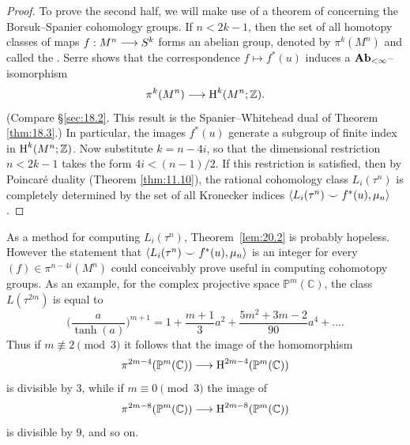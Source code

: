 \documentclass[../main]{subfiles}
\begin{document}
\begin{proof}
To prove the second half, we will make use of a theorem of \cite[p. 289]{serre} concerning the Borsuk--Spanier cohomology groups. If $n < 2 k - 1$, then the set of all homotopy classes of maps $f : M^n \longrightarrow S^k$ forms an abelian group, denoted by $\pi^k(M^n)$ and called the . Serre shows that the correspondence $f \mapsto f^\ast(u)$ induces a $\mathbf{Ab}_{<\infty}$--isomorphism \[\pi^k(M^n) \longrightarrow \operatorname{H}^k(M^n; \mathbb Z).\] (Compare \S\ref{sec:18.2}. This result is the Spanier--Whitehead dual of Theorem \ref{thm:18.3}.) In particular, the images $f^\ast(u)$ generate a subgroup of finite index in $\operatorname{H}^k(M^n; \mathbb Z)$. Now substitute $k = n - 4i$, so that the dimensional restriction $n < 2 k - 1$ takes the form $4 i < (n - 1)/2$. If this restriction is satisfied, then by Poincar\'e duality (Theorem \ref{thm:11.10}), the rational cohomology class $L_i(\tau^n)$ is completely determined by the set of all Kronecker indices $\langle L_i(\tau^n) \smile f^\ast(u),\mu_n\rangle$.
\end{proof}

\begin{remark*}
As a method for computing $L_i(\tau^n)$, Theorem~\ref{lem:20.2} is probably hopeless. However the statement that $\langle L_i(\tau^n) \smile f^\ast(u),\mu_n\rangle$ is an integer for every\newline $(f) \in \pi^{n - 4i}(M^n)$ could conceivably prove useful in computing cohomotopy groups. As an example, for the complex projective space ${\mathbb P}^m(\mathbb C)$, the class $L(\tau^{2m})$ is equal to \[\biggl(\dfrac{a}{\tanh(a)}\biggr)^{m + 1} = 1 + \frac {m + 1} 3 a^2 + \frac {5m^2 + 3m - 2} {90} a^4 + \ldots.\] Thus if $m \not \equiv 2 \pmod 3$ it follows that the image of the homomorphism \[\pi^{2m - 4}({\mathbb P}^m(\mathbb C)) \longrightarrow \operatorname{H}^{2m - 4}({\mathbb P}^m(\mathbb C))\] is divisible by $3$, while if $m \equiv 0 \pmod 3$ the image of \[\pi^{2m - 8}({\mathbb P}^m(\mathbb C)) \longrightarrow \operatorname{H}^{2m - 8}({\mathbb P}^m(\mathbb C))\] is divisible by $9$, and so on. 
\end{remark*} 
\end{document}

